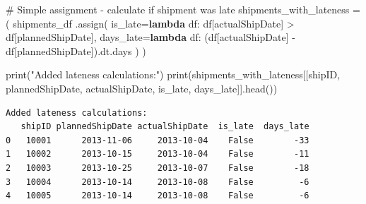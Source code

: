 \documentclass[
]{article}
\newenvironment{Shaded}{\begin{snugshade}}{\end{snugshade}}
\newcommand{\BuiltInTok}[1]{\textcolor[rgb]{0.00,0.23,0.31}{#1}}
\newcommand{\CommentTok}[1]{\textcolor[rgb]{0.37,0.37,0.37}{#1}}
\newcommand{\KeywordTok}[1]{\textcolor[rgb]{0.00,0.23,0.31}{\textbf{#1}}}
\newcommand{\NormalTok}[1]{\textcolor[rgb]{0.00,0.23,0.31}{#1}}
\newcommand{\OperatorTok}[1]{\textcolor[rgb]{0.37,0.37,0.37}{#1}}
\newcommand{\StringTok}[1]{\textcolor[rgb]{0.13,0.47,0.30}{#1}}
\begin{document}
\label{mental-model-1-assign}
\begin{Shaded}
\begin{Highlighting}[]
\CommentTok{\# Simple assignment {-} calculate if shipment was late}
\NormalTok{shipments\_with\_lateness }\OperatorTok{=}\NormalTok{ (}
\NormalTok{    shipments\_df}
\NormalTok{    .assign(}
\NormalTok{        is\_late}\OperatorTok{=}\KeywordTok{lambda}\NormalTok{ df: df[}\StringTok{\textquotesingle{}actualShipDate\textquotesingle{}}\NormalTok{] }\OperatorTok{\textgreater{}}\NormalTok{ df[}\StringTok{\textquotesingle{}plannedShipDate\textquotesingle{}}\NormalTok{],}
\NormalTok{        days\_late}\OperatorTok{=}\KeywordTok{lambda}\NormalTok{ df: (df[}\StringTok{\textquotesingle{}actualShipDate\textquotesingle{}}\NormalTok{] }\OperatorTok{{-}}\NormalTok{ df[}\StringTok{\textquotesingle{}plannedShipDate\textquotesingle{}}\NormalTok{]).dt.days}
\NormalTok{    )}
\NormalTok{)}

\BuiltInTok{print}\NormalTok{(}\StringTok{"Added lateness calculations:"}\NormalTok{)}
\BuiltInTok{print}\NormalTok{(shipments\_with\_lateness[[}\StringTok{\textquotesingle{}shipID\textquotesingle{}}\NormalTok{, }\StringTok{\textquotesingle{}plannedShipDate\textquotesingle{}}\NormalTok{, }\StringTok{\textquotesingle{}actualShipDate\textquotesingle{}}\NormalTok{, }\StringTok{\textquotesingle{}is\_late\textquotesingle{}}\NormalTok{, }\StringTok{\textquotesingle{}days\_late\textquotesingle{}}\NormalTok{]].head())}
\end{Highlighting}
\end{Shaded}

\begin{verbatim}
Added lateness calculations:
   shipID plannedShipDate actualShipDate  is_late  days_late
0   10001      2013-11-06     2013-10-04    False        -33
1   10002      2013-10-15     2013-10-04    False        -11
2   10003      2013-10-25     2013-10-07    False        -18
3   10004      2013-10-14     2013-10-08    False         -6
4   10005      2013-10-14     2013-10-08    False         -6
\end{verbatim}
\end{document}
